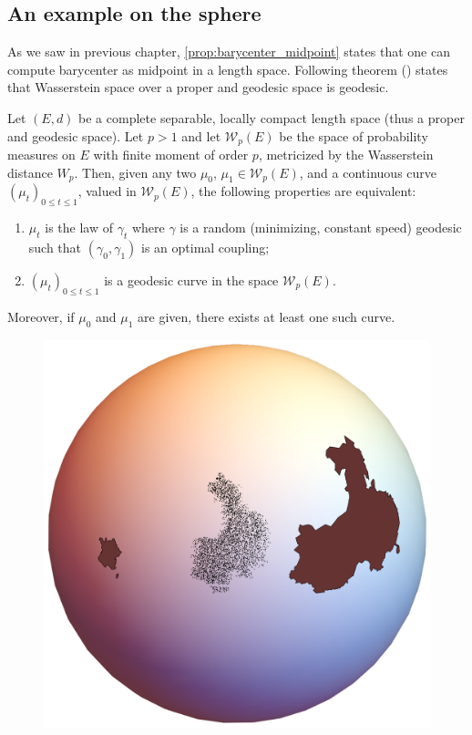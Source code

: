\subsection{An example on the sphere}

As we saw in previous chapter,
\cref{prop:barycenter_midpoint} states that one can compute barycenter as midpoint in a length space.
Following theorem (\cite[Corollary 7.22]{villani2008optimal}) states that Wasserstein space over a proper and geodesic space is geodesic.

\begin{thm}
	\label{thm:geodesic_Wasserstein_space}
	Let \( ( E , d ) \) be a complete separable, locally compact length space (thus a proper and geodesic space).
	Let \( p > 1 \) and let \( \mathcal{W}_p(E) \) be the space of probability measures
	on \( E \) with finite moment of order \( p \),
	metricized by the Wasserstein distance \( W _ { p } \).
	Then, given any two \( \mu _ { 0 }\), \( \mu _ { 1 } \in \mathcal{W}_p(E) \),
	and a continuous curve \( \left( \mu _ { t } \right) _ { 0 \leq t \leq 1 } \),
	valued in \( \mathcal{W}_p(E) \),
	the following properties are equivalent:
	\begin{enumerate}
		\item \( \mu _ { t } \) is the law of \(\gamma _ { t } \) where \( \gamma \) is a random (minimizing, constant speed)
		      geodesic such that \( \left( \gamma _ { 0 } , \gamma _ { 1 } \right) \) is an optimal coupling;
		\item \( \left( \mu _ { t } \right) _ { 0 \leq t \leq 1 } \) is a geodesic curve in the space \( \mathcal{W}_p(E) \).
	\end{enumerate}
	Moreover, if \( \mu _ { 0 } \) and \( \mu _ { 1 } \) are given, there exists at least one such curve.
\end{thm}

\begin{figure}
	\includegraphics[width=\linewidth]{Chapters/OPT_sphere.pdf}
\end{figure}

